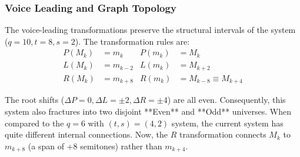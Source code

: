 \documentclass[12pt,letterpaper]{amsart}
\begin{document}
\subsubsection{Voice Leading and Graph Topology}
The voice-leading transformations preserve the structural intervals of the system ($q=10, t=8, s=2$). The transformation rules are:
\begin{align*}
    P(M_k) &= m_k & P(m_k) &= M_k \\
    L(M_k) &= m_{k-2} & L(m_k) &= M_{k+2} \\
    R(M_k) &= m_{k+8} & R(m_k) &= M_{k-8} \equiv M_{k+4}
\end{align*}

The root shifts ($\Delta P=0, \Delta L=\pm 2, \Delta R=\pm 4$) are all even. Consequently, this system also fractures into two disjoint **Even** and **Odd** universes. When compared to the $q=6$ with $(t,s)=(4,2)$ system, the current system has quite different internal connections. Now, the $R$ transformation connects $M_k$ to $m_{k+8}$ (a span of +8 semitones) rather than $m_{k+4}$.
\end{document}

